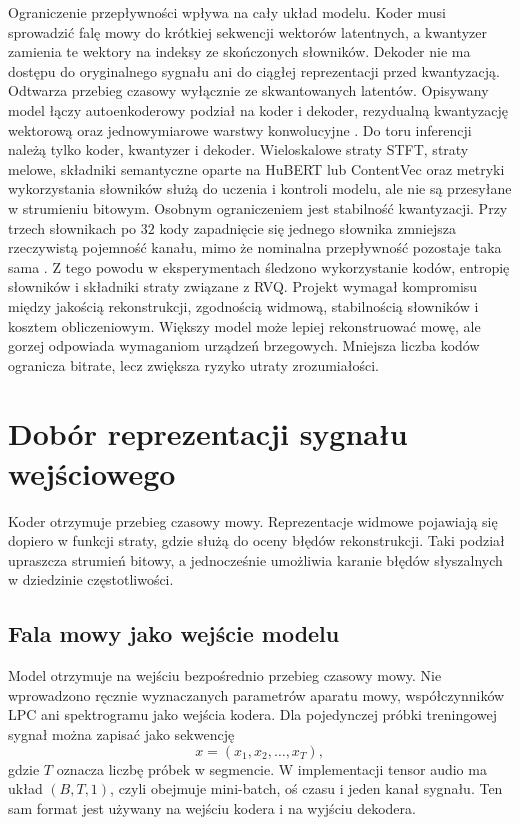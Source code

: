 Ograniczenie przepływności wpływa na cały układ modelu. Koder musi sprowadzić falę mowy do krótkiej sekwencji wektorów latentnych, a kwantyzer zamienia te wektory na indeksy ze skończonych słowników. Dekoder nie ma dostępu do oryginalnego sygnału ani do ciągłej reprezentacji przed kwantyzacją. Odtwarza przebieg czasowy wyłącznie ze skwantowanych latentów. Opisywany model łączy autoenkoderowy podział na koder i dekoder, rezydualną kwantyzację wektorową oraz jednowymiarowe warstwy konwolucyjne \cite{Zeghidour2021SoundStream,Defossez2022Encodec}. Do toru inferencji należą tylko koder, kwantyzer i dekoder. Wieloskalowe straty STFT, straty melowe, składniki semantyczne oparte na HuBERT lub ContentVec \cite{Hsu2021HuBERT,Qian2022ContentVec} oraz metryki wykorzystania słowników służą do uczenia i kontroli modelu, ale nie są przesyłane w strumieniu bitowym. Osobnym ograniczeniem jest stabilność kwantyzacji. Przy trzech słownikach po \(32\) kody zapadnięcie się jednego słownika zmniejsza rzeczywistą pojemność kanału, mimo że nominalna przepływność pozostaje taka sama \cite{VanDenOord2017NeuralDiscrete,Zeghidour2021SoundStream,Defossez2022Encodec}. Z tego powodu w eksperymentach śledzono wykorzystanie kodów, entropię słowników i składniki straty związane z RVQ. Projekt wymagał kompromisu między jakością rekonstrukcji, zgodnością widmową, stabilnością słowników i kosztem obliczeniowym. Większy model może lepiej rekonstruować mowę, ale gorzej odpowiada wymaganiom urządzeń brzegowych. Mniejsza liczba kodów ogranicza bitrate, lecz zwiększa ryzyko utraty zrozumiałości.

\section{Dobór reprezentacji sygnału wejściowego}
\label{sec:reprezentacja-wejsciowa}

Koder otrzymuje przebieg czasowy mowy. Reprezentacje widmowe pojawiają się dopiero w funkcji straty, gdzie służą do oceny błędów rekonstrukcji. Taki podział upraszcza strumień bitowy, a jednocześnie umożliwia karanie błędów słyszalnych w dziedzinie częstotliwości.

\subsection{Fala mowy jako wejście modelu}

Model otrzymuje na wejściu bezpośrednio przebieg czasowy mowy. Nie wprowadzono ręcznie wyznaczanych parametrów aparatu mowy, współczynników LPC ani spektrogramu jako wejścia kodera. Dla pojedynczej próbki treningowej sygnał można zapisać jako sekwencję
\[
x = (x_1, x_2, \ldots, x_T),
\]
gdzie \(T\) oznacza liczbę próbek w segmencie. W implementacji tensor audio ma układ \((B,T,1)\), czyli obejmuje mini-batch, oś czasu i jeden kanał sygnału. Ten sam format jest używany na wejściu kodera i na wyjściu dekodera.

